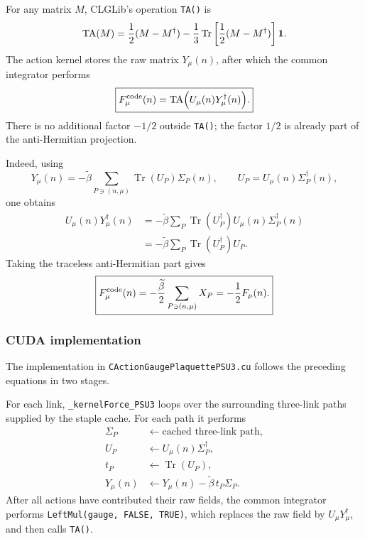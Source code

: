 For any matrix $M$, CLGLib's operation \texttt{TA()} is
\begin{equation}
{\rm TA}(M)=\frac{1}{2}(M-M^\dagger)
-\frac{1}{3}\operatorname{Tr}\left[\frac{1}{2}(M-M^\dagger)\right]\mathbf 1.
\end{equation}
The action kernel stores the raw matrix $Y_\mu(n)$, after which the common
integrator performs
\begin{equation}
\boxed{
F^{\rm code}_\mu(n)
={\rm TA}\Bigl(U_\mu(n)Y_\mu^\dagger(n)\Bigr).
}
\end{equation}
There is no additional factor $-1/2$ outside \texttt{TA()}; the factor
$1/2$ is already part of the anti-Hermitian projection.

Indeed, using
\begin{equation}
Y_\mu(n)=-\widetilde\beta\sum_{P\ni(n,\mu)}
\operatorname{Tr}(U_P)\Sigma_P(n),
\qquad
U_P=U_\mu(n)\Sigma_P^\dagger(n),
\end{equation}
one obtains
\begin{align}
U_\mu(n)Y_\mu^\dagger(n)
&=-\widetilde\beta\sum_P
  \operatorname{Tr}(U_P^\dagger)
  U_\mu(n)\Sigma_P^\dagger(n)\nonumber\\
&=-\widetilde\beta\sum_P
  \operatorname{Tr}(U_P^\dagger)U_P.
\end{align}
Taking the traceless anti-Hermitian part gives
\begin{equation}
\boxed{
F^{\rm code}_\mu(n)
=-\frac{\widetilde\beta}{2}\sum_{P\ni(n,\mu)}X_P
=-\frac{1}{2}F_\mu(n).
}
\end{equation}

\subsubsection{CUDA implementation}

The implementation in \texttt{CActionGaugePlaquettePSU3.cu} follows the
preceding equations in two stages.

For each link, \texttt{\_kernelForce\_PSU3} loops over the surrounding
three-link paths supplied by the staple cache.  For each path it performs
\begin{align}
\Sigma_P&\leftarrow\text{cached three-link path},\\
U_P&\leftarrow U_\mu(n)\Sigma_P^\dagger,\\
t_P&\leftarrow\operatorname{Tr}(U_P),\\
Y_\mu(n)&\leftarrow
Y_\mu(n)-\widetilde\beta\,t_P\Sigma_P.
\end{align}
After all actions have contributed their raw fields, the common integrator
performs \texttt{LeftMul(gauge, FALSE, TRUE)}, which replaces the raw field by
$U_\mu Y_\mu^\dagger$, and then calls \texttt{TA()}.

